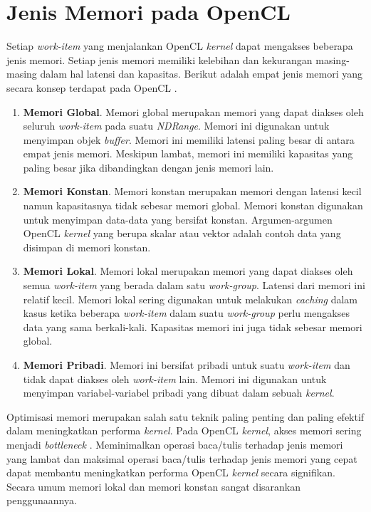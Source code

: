 \section{Jenis Memori pada OpenCL}
Setiap \textit{work-item} yang menjalankan OpenCL \textit{kernel} dapat mengakses beberapa jenis memori. Setiap jenis memori memiliki kelebihan dan kekurangan masing-masing dalam hal latensi dan kapasitas. Berikut adalah empat jenis memori yang secara konsep terdapat pada OpenCL \cite{opencl}.

\begin{enumerate}

\item \textbf{Memori Global}. Memori global merupakan memori yang dapat diakses oleh seluruh \textit{work-item} pada suatu \textit{NDRange}. Memori ini digunakan untuk menyimpan objek \textit{buffer}. Memori ini memiliki latensi paling besar di antara empat jenis memori. Meskipun lambat, memori ini memiliki kapasitas yang paling besar jika dibandingkan dengan jenis memori lain.

\item \textbf{Memori Konstan}. Memori konstan merupakan memori dengan latensi kecil namun kapasitasnya tidak sebesar memori global. Memori konstan digunakan untuk menyimpan data-data yang bersifat konstan. Argumen-argumen OpenCL \textit{kernel} yang berupa skalar atau vektor adalah contoh data yang disimpan di memori konstan.

\item \textbf{Memori Lokal}. Memori lokal merupakan memori yang dapat diakses oleh semua \textit{work-item} yang berada dalam satu \textit{work-group}. Latensi dari memori ini relatif kecil. Memori lokal sering digunakan untuk melakukan \textit{caching} dalam kasus ketika beberapa \textit{work-item} dalam suatu \textit{work-group} perlu mengakses data yang sama berkali-kali. Kapasitas memori ini juga tidak sebesar memori global.

\item \textbf{Memori Pribadi}. Memori ini bersifat pribadi untuk suatu \textit{work-item} dan tidak dapat diakses oleh \textit{work-item} lain. Memori ini digunakan untuk menyimpan variabel-variabel pribadi yang dibuat dalam sebuah \textit{kernel}.

\end{enumerate}

Optimisasi memori merupakan salah satu teknik paling penting dan paling efektif dalam meningkatkan performa \textit{kernel}. Pada OpenCL \textit{kernel}, akses memori sering menjadi \textit{bottleneck} \cite{adrenoopencl}. Meminimalkan operasi baca/tulis terhadap jenis memori yang lambat dan maksimal operasi baca/tulis terhadap jenis memori yang cepat dapat membantu meningkatkan performa OpenCL \textit{kernel} secara signifikan. Secara umum memori lokal dan memori konstan sangat disarankan penggunaannya.

